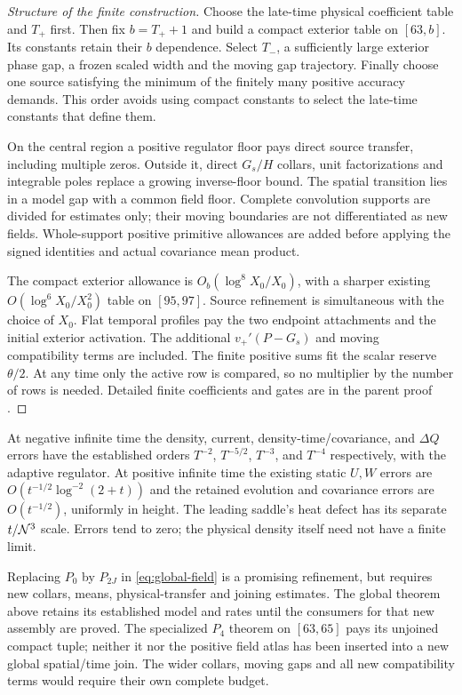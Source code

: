 \begin{proof}[Structure of the finite construction]
Choose the late-time physical coefficient table and $T_+$ first.
Then fix $b=T_++1$ and build a compact exterior table on $[63,b]$.
Its constants retain their $b$ dependence. Select $T_-$, a sufficiently
large exterior phase gap, a frozen scaled width and the moving gap
trajectory. Finally choose one source satisfying the minimum of the
finitely many positive accuracy demands. This order avoids using
compact constants to select the late-time constants that define them.

On the central region a positive regulator floor pays direct source
transfer, including multiple zeros. Outside it, direct $G_s/H$ collars,
unit factorizations and integrable poles replace a growing inverse-floor
bound. The spatial transition lies in a model gap with a common field
floor. Complete convolution supports are divided for estimates only;
their moving boundaries are not differentiated as new fields.
Whole-support positive primitive allowances are added before applying
the signed identities and actual covariance mean product.

The compact exterior allowance is
$O_b(\log^8X_0/X_0)$, with a sharper existing
$O(\log^6X_0/X_0^2)$ table on $[95,97]$. Source refinement is
simultaneous with the choice of $X_0$. Flat temporal profiles pay the
two endpoint attachments and the initial exterior activation. The
additional $v_+'(P-G_s)$ and moving compatibility terms are included.
The finite positive sums fit the scalar reserve $\theta/2$.
At any time only the active row is compared, so no multiplier by the
number of rows is needed. Detailed finite coefficients and gates are
in the parent proof \cite{global}.
\end{proof}

At negative infinite time the density, current, density-time/covariance,
and $\Delta Q$ errors have the established orders
$T^{-2}$, $T^{-5/2}$, $T^{-3}$, and $T^{-4}$ respectively, with the
adaptive regulator. At positive infinite time the existing static
$U,W$ errors are $O(t^{-1/2}\log^{-2}(2+t))$ and the retained
evolution and covariance errors are $O(t^{-1/2})$, uniformly in
height. The leading saddle's heat defect has its separate $t/\mathcal N^3$
scale. Errors tend to zero; the physical density itself need not have
a finite limit.

Replacing $P_0$ by $P_{2J}$ in \eqref{eq:global-field} is a promising
refinement, but requires new collars, means, physical-transfer and
joining estimates. The global theorem above retains its established
model and rates until the consumers for that new assembly are proved. The specialized $P_4$ theorem on $[63,65]$ pays its unjoined compact tuple; neither it nor the positive field atlas has been inserted into a new global spatial/time join. The wider collars, moving gaps and all new compatibility terms would require their own complete budget.

